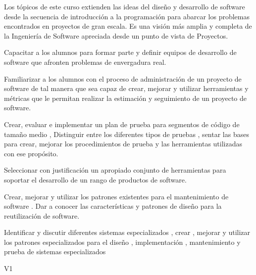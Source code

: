 \begin{syllabus}


\begin{justification}
Los tópicos de este curso extienden las ideas del diseño y desarrollo de software desde la secuencia de introducción a la programación para
abarcar los problemas encontrados en proyectos de gran escala. Es una visión más amplia y completa de la Ingeniería
de Software apreciada desde un punto de vista de Proyectos.
\end{justification}

\begin{goals}
\item Capacitar a los alumnos para formar parte y definir equipos de desarrollo de software que afronten problemas de envergadura real.
\item Familiarizar a los alumnos con el proceso de administración de un proyecto de software de tal manera que sea capaz de crear, mejorar y utilizar herramientas y métricas que le permitan realizar la estimación y seguimiento de un proyecto de software.
\item Crear, evaluar e implementar un plan de prueba para segmentos de código de tamaño medio  , Distinguir entre los diferentes tipos de pruebas ,  sentar las bases para  crear, mejorar los procedimientos de prueba y las herramientas utilizadas con ese propósito.
\item Seleccionar con justificación un apropiado conjunto de herramientas para soportar el desarrollo de un rango de productos de software.
\item Crear, mejorar y utilizar  los patrones existentes para el mantenimiento de software . Dar a conocer las características y patrones de diseño para la reutilización de software.
\item Identificar y discutir diferentes sistemas especializados , crear , mejorar y utilizar los patrones especializados para el diseño , implementación , mantenimiento y prueba   de sistemas especializados
\end{goals}

\begin{outcomes}{V1}
    \item {}
    \item {}
    \item {}
\end{outcomes}


\end{syllabus}
